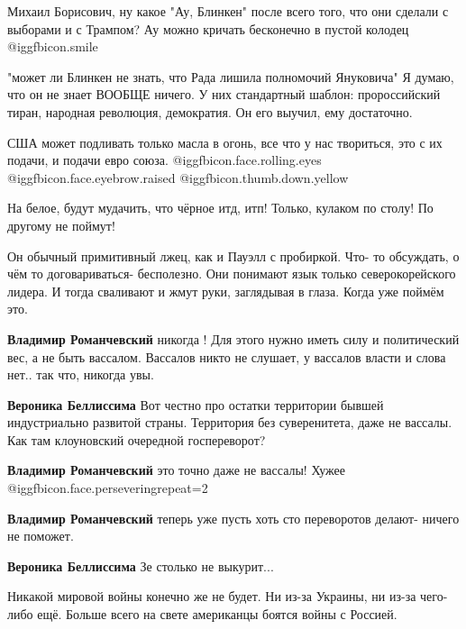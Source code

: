 \begin{itemize}

Михаил Борисович, ну какое "Ау, Блинкен" после всего того, что они сделали с
выборами и с Трампом? Ау можно кричать бесконечно в пустой колодец  @igg{fbicon.smile} 


"может ли Блинкен не знать, что Рада лишила полномочий Януковича"
Я думаю, что он не знает ВООБЩЕ ничего. У них стандартный шаблон: пророссийский тиран, народная революция, демократия. Он его выучил, ему достаточно.

США может подливать только масла в огонь, все что у нас твориться, это с их подачи, и подачи евро союза.  @igg{fbicon.face.rolling.eyes}  @igg{fbicon.face.eyebrow.raised}  @igg{fbicon.thumb.down.yellow} 

На белое, будут мудачить, что чёрное итд, итп!
Только, кулаком по столу!
По другому не поймут!


Он обычный примитивный лжец, как и Пауэлл с пробиркой. Что- то обсуждать, о чём
то договариваться- бесполезно. Они понимают язык только северокорейского
лидера. И тогда сваливают и жмут руки, заглядывая в глаза. Когда уже поймём
это.

\begin{itemize} %
\textbf{Владимир Романчевский} никогда ! Для этого нужно иметь силу и политический вес, а не быть вассалом. Вассалов никто не слушает, у вассалов власти и слова нет.. так что, никогда увы.

\textbf{Вероника Беллиссима} Вот честно про остатки территории бывшей индустриально развитой страны. Территория без суверенитета, даже не вассалы. Как там клоуновский очередной госпереворот?

\textbf{Владимир Романчевский} это точно даже не вассалы! Хужее @igg{fbicon.face.persevering}{repeat=2} 

\textbf{Владимир Романчевский} теперь уже пусть хоть сто переворотов делают- ничего не поможет.

\textbf{Вероника Беллиссима} Зе столько не выкурит...
\end{itemize} %


Никакой мировой войны конечно же не будет. Ни из-за Украины, ни из-за чего-либо
ещё. Больше всего на свете американцы боятся войны с Россией.


\end{itemize}
